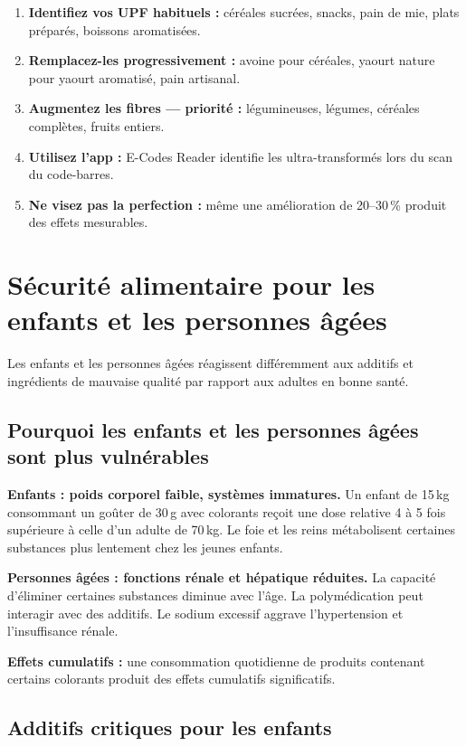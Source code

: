 \documentclass[a5paper,12pt,oneside,openany]{book}
\begin{document}
\begin{enumerate}
  \item \textbf{Identifiez vos UPF habituels :} céréales sucrées, snacks,
    pain de mie, plats préparés, boissons aromatisées.
  \item \textbf{Remplacez-les progressivement :} avoine pour céréales, yaourt
    nature pour yaourt aromatisé, pain artisanal.
  \item \textbf{Augmentez les fibres --- priorité :} légumineuses, légumes,
    céréales complètes, fruits entiers.
  \item \textbf{Utilisez l'app :} E-Codes Reader identifie les ultra-transformés
    lors du scan du code-barres.
  \item \textbf{Ne visez pas la perfection :} même une amélioration de
    20--30\,\% produit des effets mesurables.
\end{enumerate}

\chapter{Sécurité alimentaire pour les enfants et les personnes âgées}

Les enfants et les personnes âgées réagissent différemment aux additifs et
ingrédients de mauvaise qualité par rapport aux adultes en bonne santé.

\section{Pourquoi les enfants et les personnes âgées sont plus vulnérables}

\textbf{Enfants : poids corporel faible, systèmes immatures.} Un enfant de 15\,kg
consommant un goûter de 30\,g avec colorants reçoit une dose relative 4 à 5 fois
supérieure à celle d'un adulte de 70\,kg. Le foie et les reins métabolisent
certaines substances plus lentement chez les jeunes enfants.

\textbf{Personnes âgées : fonctions rénale et hépatique réduites.} La capacité
d'éliminer certaines substances diminue avec l'âge. La polymédication peut
interagir avec des additifs. Le sodium excessif aggrave l'hypertension et
l'insuffisance rénale.

\textbf{Effets cumulatifs :} une consommation quotidienne de produits contenant
certains colorants produit des effets cumulatifs significatifs.

\section{Additifs critiques pour les enfants}
\end{document}
